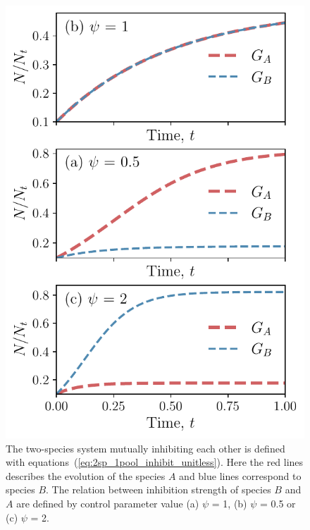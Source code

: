 \documentclass[10pt,A4paper]{article}
\numberwithin{equation}{section}
\begin{document}
\begin{figure}[H]
    \begin{center}
    \includegraphics[width=0.9\columnwidth]{Figures/pool_model_1pool_inhib.pdf}
    \caption{
        The two-species system mutually inhibiting each other is defined with equations~(\ref{eq:2sp_1pool_inhibit_unitless}).
        Here the red lines describes the evolution of the species $A$ and blue lines correspond to species $B$.
        The relation between inhibition strength of species $B$ and $A$ are defined by control parameter value (a) $\psi$ = 1, (b) $\psi$ = 0.5 or (c) $\psi$ = 2.
    }
    \label{fig:1pool_2sp_inhibit}
    \end{center}
\end{figure}
%
%
%
\end{document}
